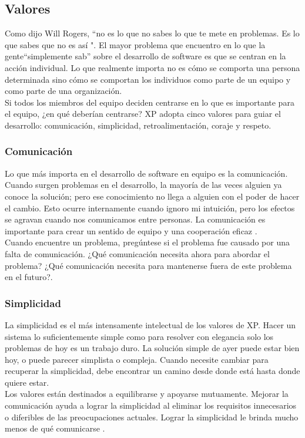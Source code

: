 \begin{spacing}{1.5}
	\subsection{Valores}
		Como dijo Will Rogers, “no es lo que no sabes lo que te mete en problemas. Es lo que sabes que no es así ". El mayor problema que encuentro en lo que la gente``simplemente sab'' sobre el desarrollo de software es que se centran en la acción individual. Lo que realmente importa no es cómo se comporta una persona determinada sino cómo se comportan los individuos como parte de un equipo y como parte de una organización\cite{chap2_extreme_programming}.\\
		Si todos los miembros del equipo deciden centrarse en lo que es importante para el equipo, ¿en qué deberían centrarse? XP adopta cinco valores para guiar el desarrollo: comunicación, simplicidad, retroalimentación, coraje y respeto.
		\subsubsection{Comunicaci\'{o}n}
		Lo que más importa en el desarrollo de software en equipo es la comunicación. Cuando surgen problemas en el desarrollo, la mayoría de las veces alguien ya conoce la solución; pero ese conocimiento no llega a alguien con el poder de hacer el cambio. Esto ocurre internamente cuando ignoro mi intuición, pero los efectos se agravan cuando nos comunicamos entre personas. La comunicación es importante para crear un sentido de equipo y una cooperación eficaz \cite{chap2_extreme_programming}.\\
		Cuando encuentre un problema, pregúntese si el problema fue causado por una falta de comunicación. ¿Qué comunicación necesita ahora para abordar el problema? ¿Qué comunicación necesita para mantenerse fuera de este problema en el futuro?.
		\subsubsection{Simplicidad}
		La simplicidad es el más intensamente intelectual de los valores de XP. Hacer un sistema lo suficientemente simple como para resolver con elegancia solo los problemas de hoy es un trabajo duro. La solución simple de ayer puede estar bien hoy, o puede parecer simplista o compleja. Cuando necesite cambiar para recuperar la simplicidad, debe encontrar un camino desde donde está hasta donde quiere estar.\\
		Los valores están destinados a equilibrarse y apoyarse mutuamente. Mejorar la comunicación ayuda a lograr la simplicidad al eliminar los requisitos innecesarios o diferibles de las preocupaciones actuales. Lograr la simplicidad le brinda mucho menos de qué comunicarse \cite{chap2_extreme_programming}.

\end{spacing}
